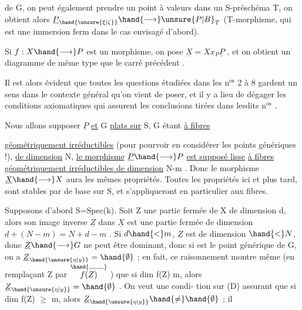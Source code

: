 de G, on peut également prendre un point à valeurs dans un S-préschéma T,
on obtient alors $\underline{P}_{\hand{\unsure{\xi|\zeta}}} \hand{\longrightarrow} \unsure{P|B}_T$ (T-morphisme, qui est une immersion ferm
dans le cas envisagé d'abord).

Si $f:X \hand{\longrightarrow} P$ est un morphisme, on pose $\underline{X} = Xx_P\underline{P}$ , et on obtient
un diagramme de même type que le carré précédent
.

Il est alors évident que toutes les questions étudiées dans les n$^{\text{os}}$ 2 à 8
gardent un sens dans le contexte général qu'on vient de poser, et il y a
lieu de dégager les conditions axiomatiques qui assurent les conclusions
tirées dans lesdits n$^{\text{os}}$ .

Nous allons supposer $\underline{P}$ \uline{et} G \uline{plats sur} S, G étant \uline{à fibres}

\uline{géométriquement irréductibles} (pour pourvoir en considérer les points
génériques !), \uline{de dimension} N, \uline{le morphisme} $\underline{P} \hand{\longrightarrow} P$ \uline{est supposé lisse}
\uline{à fibres géométriquement irréductibles de dimension} N-m . Donc le
morphisme $\underline{X} \hand{\longrightarrow} X$ aura les mêmes propriétés. Toutes les propriétés
 ici et plus tard, sont stables par  de base sur S, et s'appliqueront
en particulier aux fibres.

Supposons d'abord S=Spec(k). Soit Z une partie fermée de X de
dimension d, alors son image inverse $\underline{Z}$ dans $\underline{X}$ est une partie fermée de
dimension $d + (N-m) = N + d-m$ . Si $d \hand{<} m$, $\underline{Z}$ est de dimension $\hand{<} N$,
donc $\underline{Z} \hand{\longrightarrow} G$ ne peut être dominant, donc si  est le point générique de
G, on a $\underline{Z}_{\hand{\unsure{\eta|y}}} = \hand{\emptyset}$ ; en fait, ce raisonnement montre même (en remplaçant
Z par $\overset{\hand{\rule{1.8em}{0.35pt}}}{f(Z)}$ ) que si dim f(Z) \hand{$<$} m, alors $\underline{Z}_{\hand{\unsure{\eta|y}}} = \hand{\emptyset}$ . On veut une condi-%
tion sur (D) assurant que si dim f(Z) $\geq$ m, alors $\underline{Z}_{\hand{\unsure{\eta|y}}} \hand{\neq} \hand{\emptyset}$ ;  il

